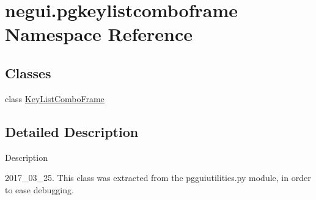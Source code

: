 \hypertarget{namespacenegui_1_1pgkeylistcomboframe}{}\section{negui.\+pgkeylistcomboframe Namespace Reference}
\label{namespacenegui_1_1pgkeylistcomboframe}
\subsection*{Classes}
\begin{DoxyCompactItemize}
\item 
class \hyperlink{classnegui_1_1pgkeylistcomboframe_1_1KeyListComboFrame}{Key\+List\+Combo\+Frame}
\end{DoxyCompactItemize}


\subsection{Detailed Description}
\begin{DoxyVerb}Description

2017_03_25.  This class was extracted from the
pgguiutilities.py module, in order to ease debugging.
\end{DoxyVerb}
 